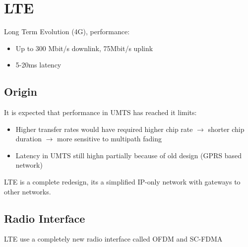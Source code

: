 
\section{LTE}
Long Term Evolution (4G), performance:
\begin{itemize}
	\item Up to 300 Mbit/s downlink, 75Mbit/s uplink
	\item 5-20ms latency
\end{itemize}

\subsection{Origin}
It is expected that performance in UMTS has reached it limits:
\begin{itemize}
	\item Higher transfer rates would have required higher chip
	rate $\to$ shorter chip duration $\to$ more sensitive to
	multipath fading
	\item Latency in UMTS still highn partially because of old
	design (GPRS based network)
\end{itemize}
LTE is a complete redesign, its a simplified IP-only network with
gateways to other networks.

\subsection{Radio Interface}
LTE use a completely new radio interface called OFDM and SC-FDMA

